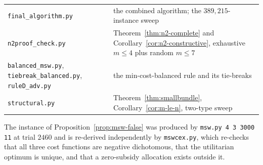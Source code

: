 \begin{center}
\begin{tabular}{@{}p{}p{}@{}}
\texttt{final\_algorithm.py} & the combined algorithm; the
                         $389{,}215$-instance sweep \\
\texttt{n2proof\_check.py} & Theorem~\ref{thm:n2-complete} and
                         Corollary~\ref{cor:n2-constructive}, exhaustive
                         $m \le 4$ plus random $m \le 7$ \\
\texttt{balanced\_msw.py}, \texttt{tiebreak\_balanced.py},
\texttt{ruleD\_adv.py} & the min-cost-balanced rule and its tie-breaks \\
\texttt{structural.py} & Theorem~\ref{thm:smallbundle},
                         Corollary~\ref{cor:m-le-n}, two-type sweep \\
\bottomrule
\end{tabular}
\end{center}

The instance of Proposition~\ref{prop:msw-false} was produced by
\texttt{msw.py 4 3 3000 11} at trial $2460$ and is re-derived independently by
\texttt{mswcex.py}, which re-checks that all three cost functions are negative
dichotomous, that the utilitarian optimum is unique, and that a zero-subsidy
allocation exists outside it.
